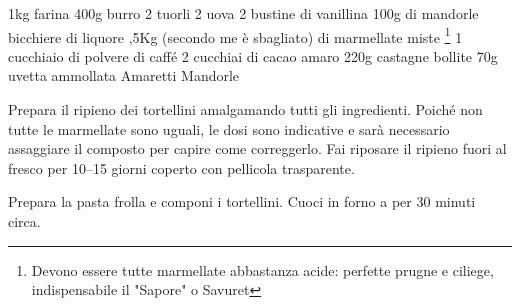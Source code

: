 \begin{ingreds}
	1kg farina
	400g burro
	2 tuorli
	2 uova
	2 bustine di vanillina
	100g di mandorle
	 bicchiere di liquore
\columnbreak
	,5Kg (secondo me è sbagliato) di marmellate miste  \footnote{Devono essere tutte marmellate abbastanza acide: perfette prugne e ciliege, indispensabile il "Sapore" o Savuret}
	1 cucchiaio di polvere di caffé 
	2 cucchiai di cacao amaro 
	220g castagne bollite 
	70g uvetta ammollata 
	Amaretti 
	Mandorle 



\end{ingreds}

\begin{method}
Prepara il ripieno dei tortellini amalgamando tutti gli ingredienti. Poiché non tutte le marmellate sono uguali, le dosi sono indicative e sarà necessario assaggiare il composto per capire come correggerlo. Fai riposare il ripieno fuori al fresco per 10--15 giorni coperto con pellicola trasparente.

	Prepara la pasta frolla e componi i tortellini. Cuoci in forno a  per 30 minuti circa.


\end{method}




